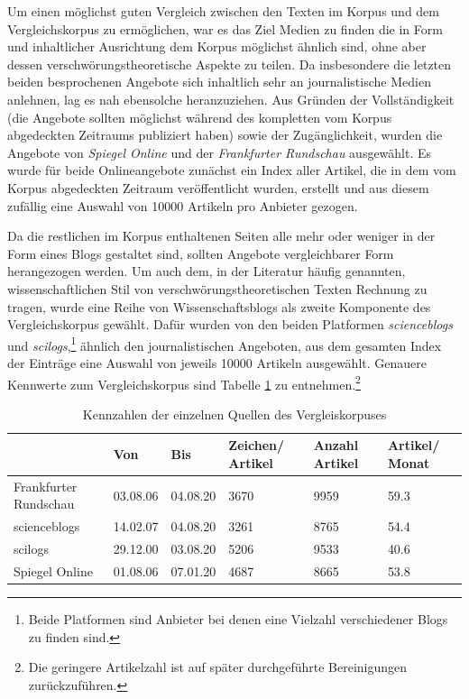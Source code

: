 \bigskip

Um einen möglichst guten Vergleich zwischen den Texten im Korpus und dem Vergleichskorpus zu ermöglichen, war es das Ziel Medien zu finden die in Form und inhaltlicher Ausrichtung dem Korpus möglichst ähnlich sind, ohne aber dessen verschwörungstheoretische Aspekte zu teilen.
Da insbesondere die letzten beiden besprochenen Angebote sich inhaltlich sehr an journalistische  Medien anlehnen, lag es nah ebensolche heranzuziehen.
Aus Gründen der Vollständigkeit (die Angebote sollten möglichst während des kompletten vom Korpus abgedeckten Zeitraums publiziert haben) sowie der Zugänglichkeit, wurden die Angebote von \textit{Spiegel Online} und der \textit{Frankfurter Rundschau} ausgewählt.
Es wurde für beide Onlineangebote zunächst ein Index aller Artikel, die in dem vom Korpus abgedeckten Zeitraum veröffentlicht wurden, erstellt und aus diesem zufällig eine Auswahl von 10000 Artikeln pro Anbieter gezogen.

Da die restlichen im Korpus enthaltenen Seiten alle mehr oder weniger in der Form eines Blogs gestaltet sind, sollten Angebote vergleichbarer Form herangezogen werden.
Um auch dem, in der Literatur häufig genannten, wissenschaftlichen Stil von verschwörungstheoretischen Texten Rechnung zu tragen, wurde eine Reihe von Wissenschaftsblogs als zweite Komponente des Vergleichskorpus gewählt.
Dafür wurden von den beiden Platformen \textit{scienceblogs} und \textit{scilogs},\footnote{Beide Platformen sind Anbieter bei denen eine Vielzahl verschiedener Blogs zu finden sind.} ähnlich den journalistischen Angeboten, aus dem gesamten Index der Einträge eine Auswahl von jeweils 10000 Artikeln ausgewählt.
Genauere Kennwerte zum Vergleichskorpus sind Tabelle \ref{comcorpus-stats} zu entnehmen.\footnote{Die geringere Artikelzahl ist auf später durchgeführte Bereinigungen zurückzuführen.}

\begin{table}
    \begin{center}
        \begin{tabularx}{\textwidth}{lXXXXX}
            \toprule
            & Von & Bis & Zeichen/ Artikel & Anzahl Artikel & Artikel/ Monat\\
            \midrule
            Frankfurter Rundschau & 03.08.06 & 04.08.20 & 3670 & 9959 & 59.3\\
            scienceblogs & 14.02.07 & 04.08.20 & 3261 & 8765 & 54.4\\
            scilogs & 29.12.00 & 03.08.20 & 5206 & 9533 & 40.6\\
            Spiegel Online & 01.08.06 & 07.01.20 & 4687 & 8665 & 53.8\\
            \bottomrule
        \end{tabularx}
        \caption{Kennzahlen der einzelnen Quellen des Vergleiskorpuses}
        \label{comcorpus-stats}
    \end{center}
\end{table}

